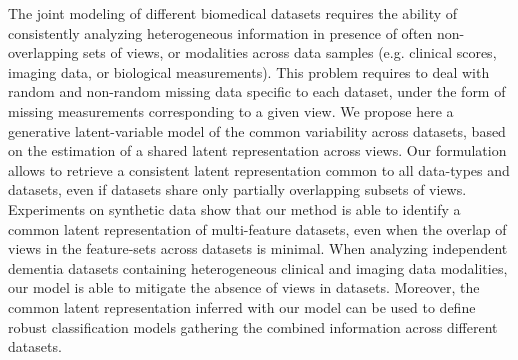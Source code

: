 The joint modeling of different biomedical datasets requires the ability of consistently analyzing heterogeneous information in presence of often non-overlapping sets of views, or modalities across data samples (e.g. clinical scores, imaging data, or biological measurements).
This problem requires to deal with random and non-random missing data specific to each dataset, under the form of missing measurements corresponding to a given view.
%
We propose here a generative latent-variable model of the common variability across datasets, based on the estimation of a shared latent representation across views.
Our formulation allows to retrieve a consistent latent representation common to all data-types and datasets, even if datasets share only partially overlapping subsets of views.
%
Experiments on synthetic data show that our method is able to identify a common latent representation of multi-feature datasets, even when the overlap of views in the feature-sets across datasets is minimal.
%
When analyzing independent dementia datasets containing heterogeneous clinical and imaging data modalities, our model is able to mitigate the absence of views in datasets.
Moreover, the common latent representation inferred with our model can be used to define robust classification models gathering the combined information across different datasets.
